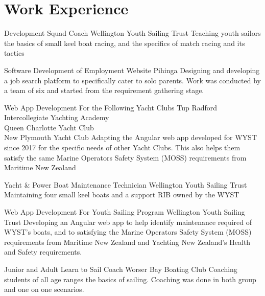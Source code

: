 \documentclass[a4paper]{twentysecondcv} %
\begin{document}

\section{Work Experience}

\begin{workexperience} %
    {Development Squad Coach}
    {Wellington Youth Sailing Trust}
    {Teaching youth sailors the basics of small keel boat racing, and the specifics of match racing and its tactics }

    {Software Development of Employment Website}
    {Pihinga}
    { Designing and developing a job search platform to specifically cater to solo parents. Work was conducted by a team of six and started from the requirement gathering stage. }

    {Web App Development For the Following Yacht Clubs}
    {Tup Radford Intercollegiate Yachting Academy\\Queen Charlotte Yacht Club\\New Plymouth Yacht Club}
    {Adapting the Angular web app developed for WYST since 2017 for the specific needs of other Yacht Clubs. This also helps them satisfy the same Marine Operators Safety System (MOSS) requirements from Maritime New Zealand}

    {Yacht \& Power Boat Maintenance Technician}
    {Wellington Youth Sailing Trust}
    {Maintaining four small keel boats and a support RIB owned by the WYST}

    {Web App Development For Youth Sailing Program}
    {Wellington Youth Sailing Trust}
    {Developing an Angular web app to help identify maintenance required of WYST's boats, and to satisfying the Marine Operators Safety System (MOSS) requirements from Maritime New Zealand and Yachting New Zealand's Health and Safety requirements.}

    {Junior and Adult Learn to Sail Coach}
    {Worser Bay Boating Club}
    {Coaching students of all age ranges the basics of sailing. Coaching was done in both group and one on one scenarios.}

\end{workexperience}
\end{document}
